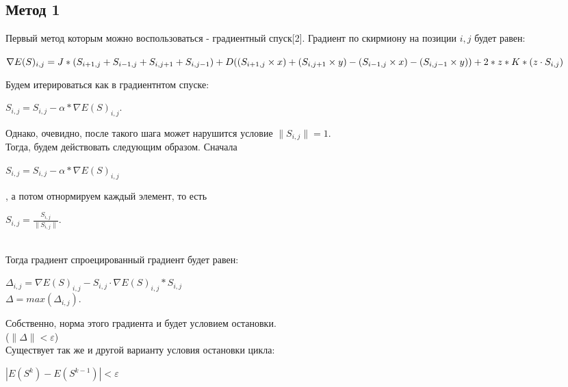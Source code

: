 \documentclass[ 12pt,x11names]{article}
\begin{document}
    \subsection{Метод 1}
    Первый метод которым можно воспользоваться  - градиентный спуск[2]. Градиент по скирмиону на позиции $i, j$ будет равен:
      \begin{center}
    $\nabla E(S)_{i, j} = J * (S_{i + 1,j} + S_{i - 1,j} + S_{i, j + 1} + S_{i, j - 1})
        + \\ D  ( (S_{i + 1,j} \times x) + (S_{i, j + 1} \times y) -  (S_{i - 1, j} \times x) - (S_{i, j - 1} \times y) )\\
        + 2 * z * K * (z \cdot S_{i, j})$\\
          \end{center}
    Будем  итерироваться как в градиентнтом спуске:
    \begin{center}
    $S_{i, j} = S_{i, j} - \alpha * \nabla E(S)_{i, j}$.\\
    \end{center}
    Однако, очевидно, после такого шага может  нарушится условие $\|S_{i, j}\| = 1$.\\
    Тогда, будем действовать следующим образом. Сначала \\
    \begin{center}
    $S_{i, j} = S_{i, j} - \alpha * \nabla E(S)_{i, j}$
    \end{center}, а потом отнормируем каждый элемент, то есть \begin{center}$S_{i, j} = \frac{S_{i, j}}{\|S_{i, j}\|}$.\end{center}\\
    Тогда градиент спроецированный градиент будет равен:\\
    \begin{center}
    $\Delta_{i, j} = \nabla E(S)_{i, j} - S_{i, j} \cdot \nabla E(S)_{i, j} * S_{i, j}$\\
    $\Delta = max(\Delta_{i, j}).$\\
    \end{center}
    Собственно, норма этого градиента и будет условием остановки.\\
    ($\| \Delta \|< \varepsilon$)\\
    Существует так же и другой варианту условия остановки цикла:\\
    \begin{center}
    $ | E(S^k) - E(S^{k-1}) | < \varepsilon$
     \end{center}\\
\end{document}

